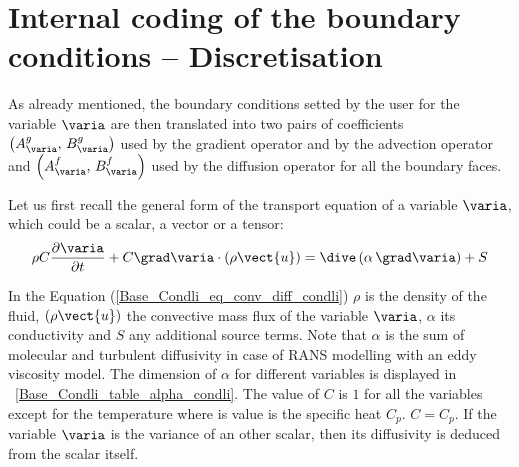\section{Internal coding of the boundary conditions -- Discretisation}

As already mentioned, the boundary conditions setted by the user for the variable $\varia$
are then translated into two pairs of coefficients $\left( A^g_\varia , \, B^g_\varia\right)$ used by the gradient operator and by the advection operator and $\left( A^f_\varia , \, B^f_\varia\right)$ used by the diffusion operator for all the boundary faces.


Let us first recall the general form of the transport equation of a variable $\varia$, which could be a scalar, 
a vector or a tensor: 
\begin{equation}\label{Base_Condli_eq_conv_diff_condli}
\displaystyle\rho C \frac{\partial \varia}{\partial t} + C \grad \varia \cdot \left( \rho \vect{u} \right) = \dive \left(\displaystyle\alpha \, \grad \varia \right) +S
\end{equation}

In the Equation (\ref{Base_Condli_eq_conv_diff_condli})
$\rho$ is the density of the fluid, $\left( \rho \vect{u} \right)$ the convective mass flux of the variable $\varia$, $\alpha$ its
conductivity and $S$ any additional source terms. 
Note that $\alpha$ is the sum of molecular and turbulent diffusivity in case of RANS modelling with an eddy viscosity model. 
The dimension of $\alpha$ for different variables is displayed in \tablename~\ref{Base_Condli_table_alpha_condli}.
The value of $C$ is $1$ for all the variables except for the temperature where is value is the specific heat $C_p$.
$C=C_p$. 
If the variable $\varia$ is the variance of an other scalar, then its diffusivity
is deduced from the scalar itself. 

